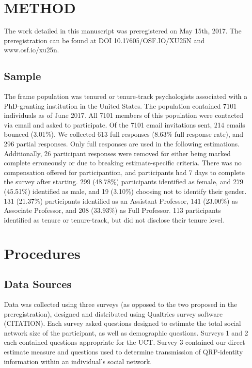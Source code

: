 \documentclass[man]{apa6}
\theoremstyle{definition}
\theoremstyle{definition}
\theoremstyle{definition}
\theoremstyle{remark}
\begin{document}
\section{METHOD}\label{method}

The work detailed in this manuscript was preregistered on May 15th,
2017. The preregistration can be found at DOI 10.17605/OSF.IO/XU25N and
www.osf.io/xu25n.

\subsection{Sample}\label{sample}

The frame population was tenured or tenure-track psychologists
associated with a PhD-granting institution in the United States. The
population contained 7101 individuals as of June 2017. All 7101 members
of this population were contacted via email and asked to participate. Of
the 7101 email invitations sent, 214 emails bounced (3.01\%). We
collected 613 full responses (8.63\% full response rate), and 296
partial responses. Only full responses are used in the following
estimations. Additionally, 26 participant responses were removed for
either being marked complete erroneously or due to breaking
estimate-specific criteria. There was no compensation offered for
participantion, and participants had 7 days to complete the survey after
starting. 299 (48.78\%) participants identified as female, and 279
(45.51\%) identified as male, and 19 (3.10\%) choosing not to identify
their gender. 131 (21.37\%) participants identified as an Assistant
Professor, 141 (23.00\%) as Associate Professor, and 208 (33.93\%) as
Full Professor. 113 participants identified as tenure or tenure-track,
but did not disclose their tenure level.

\section{Procedures}\label{procedures}

\subsection{Data Sources}\label{data-sources}

Data was collected using three surveys (as opposed to the two proposed
in the preregistration), designed and distributed using Qualtrics survey
software (CITATION). Each survey asked questions designed to estimate
the total social network size of the participant, as well as demographic
questions. Surveys 1 and 2 each contained questions appropriate for the
UCT. Survey 3 contained our direct estimate measure and questions used
to determine transmission of QRP-identity information within an
individual's social network.
\end{document}
